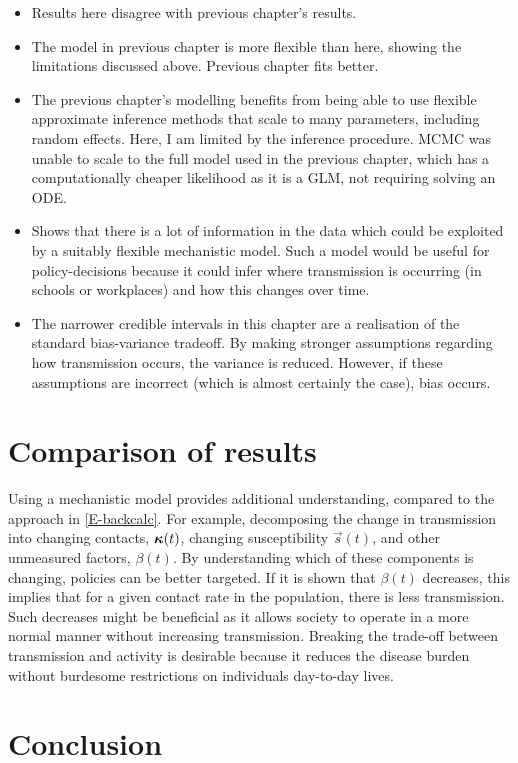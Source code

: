\documentclass[thesis.tex]{subfiles}
\begin{document}

\begin{itemize}
    \item Results here disagree with previous chapter's results.
    \item The model in previous chapter is more flexible than here, showing the limitations discussed above. Previous chapter fits better.
    \item The previous chapter's modelling benefits from being able to use flexible approximate inference methods that scale to many parameters, including random effects. Here, I am limited by the inference procedure. MCMC was unable to scale to the full model used in the previous chapter, which has a computationally cheaper likelihood as it is a GLM, not requiring solving an ODE.
    \item Shows that there is a lot of information in the data which could be exploited by a suitably flexible mechanistic model. Such a model would be useful for policy-decisions because it could infer where transmission is occurring (\eg in schools or workplaces) and how this changes over time.
    \item The narrower credible intervals in this chapter are a realisation of the standard bias-variance tradeoff. By making stronger assumptions regarding how transmission occurs, the variance is reduced. However, if these assumptions are incorrect (which is almost certainly the case), bias occurs.
\end{itemize}


\section{Comparison of results} \label{transmission:sec:comparison}


Using a mechanistic model provides additional understanding, compared to the approach in \cref{E-backcalc}.
For example, decomposing the change in transmission into changing contacts, $\bm{\kappa}(t)$, changing susceptibility $\vec{s}(t)$, and other unmeasured factors, $\beta(t)$.
By understanding which of these components is changing, policies can be better targeted.
If it is shown that $\beta(t)$ decreases, this implies that for a given contact rate in the population, there is less transmission.
Such decreases might be beneficial as it allows society to operate in a more normal manner without increasing transmission.
Breaking the trade-off between transmission and activity is desirable because it reduces the disease burden without burdesome restrictions on individuals day-to-day lives.

\section{Conclusion}


\ifSubfilesClassLoaded{
  \listoftodos
}{}
\end{document}
